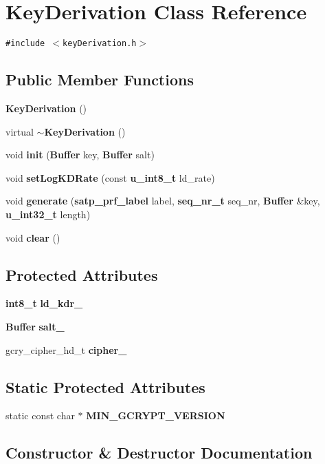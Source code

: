 \section{Key\-Derivation Class Reference}
\label{classKeyDerivation}
{\tt \#include $<$key\-Derivation.h$>$}

\subsection*{Public Member Functions}
\begin{CompactItemize}
\item 
{\bf Key\-Derivation} ()
\item 
virtual {\bf $\sim$Key\-Derivation} ()
\item 
void {\bf init} ({\bf Buffer} key, {\bf Buffer} salt)
\item 
void {\bf set\-Log\-KDRate} (const {\bf u\_\-int8\_\-t} ld\_\-rate)
\item 
void {\bf generate} ({\bf satp\_\-prf\_\-label} label, {\bf seq\_\-nr\_\-t} seq\_\-nr, {\bf Buffer} \&key, {\bf u\_\-int32\_\-t} length)
\item 
void {\bf clear} ()
\end{CompactItemize}
\subsection*{Protected Attributes}
\begin{CompactItemize}
\item 
{\bf int8\_\-t} {\bf ld\_\-kdr\_\-}
\item 
{\bf Buffer} {\bf salt\_\-}
\item 
gcry\_\-cipher\_\-hd\_\-t {\bf cipher\_\-}
\end{CompactItemize}
\subsection*{Static Protected Attributes}
\begin{CompactItemize}
\item 
static const char $\ast$ {\bf MIN\_\-GCRYPT\_\-VERSION}
\end{CompactItemize}


\subsection{Constructor \& Destructor Documentation}
